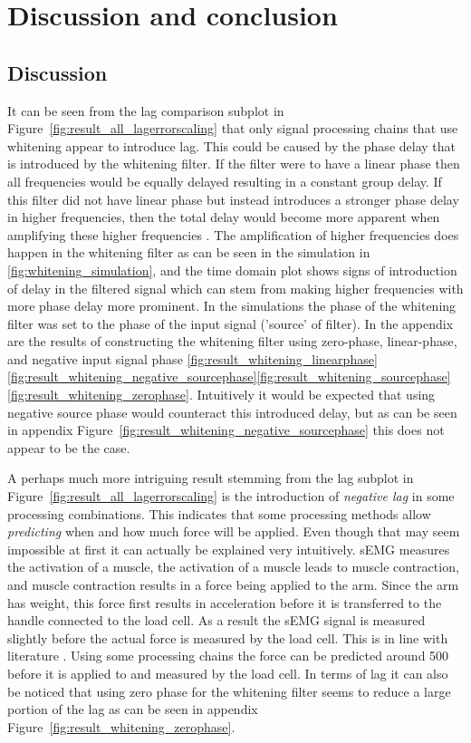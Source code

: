\chapter{Discussion and conclusion}
\section{Discussion}

It can be seen from the lag comparison subplot in Figure~\ref{fig:result_all_lagerrorscaling} that only signal processing chains that use whitening appear to introduce lag. This could be caused by the phase delay that is introduced by the whitening filter. If the filter were to have a linear phase then all frequencies would be equally delayed resulting in a constant group delay. If this filter did not have linear phase but instead introduces a stronger phase delay in higher frequencies, then the total delay would become more apparent when amplifying these higher frequencies \cite{phase_delay_frequencies}. The amplification of higher frequencies does happen in the whitening filter as can be seen in the simulation in \ref{fig:whitening_simulation}, and the time domain plot shows signs of introduction of delay in the filtered signal which can stem from making higher frequencies with more phase delay more prominent. In the simulations the phase of the whitening filter was set to the phase of the input signal ('source' of filter). In the appendix are the results of constructing the whitening filter using zero-phase, linear-phase, and negative input signal phase \ref{fig:result_whitening_linearphase} \ref{fig:result_whitening_negative_sourcephase}\ref{fig:result_whitening_sourcephase}\ref{fig:result_whitening_zerophase}. Intuitively it would be expected that using negative source phase would counteract this introduced delay, but as can be seen in appendix Figure~\ref{fig:result_whitening_negative_sourcephase} this does not appear to be the case. 

A perhaps much more intriguing result stemming from the lag subplot in Figure~\ref{fig:result_all_lagerrorscaling} is the introduction of \textit{negative lag} in some processing combinations. This indicates that some processing methods allow \textit{predicting} when and how much force will be applied. Even though that may seem impossible at first it can actually be explained very intuitively. sEMG measures the activation of a muscle, the activation of a muscle leads to muscle contraction, and muscle contraction results in a force being applied to the arm. Since the arm has weight, this force first results in acceleration before it is transferred to the handle connected to the load cell. As a result the sEMG signal is measured slightly before the actual force is measured by the load cell. This is in line with literature \cite{human_robotics}. Using some processing chains the force can be predicted around \SI{500}{\milli\seconds} before it is applied to and measured by the load cell. In terms of lag it can also be noticed that using zero phase for the whitening filter seems to reduce a large portion of the lag as can be seen in appendix Figure~\ref{fig:result_whitening_zerophase}.

